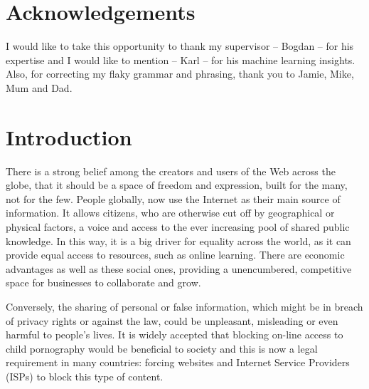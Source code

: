 \documentclass[ %
                    author={Samuel Russell},
                supervisor={Prof. Bogdan Warinschi},
                    degree={MEng},
                     title={Innocuous Ciphertexts},
                  subtitle={The DE-CENSOR Scheme},
                      type={research},
                      year={2018} ]{dissertation}
\begin{document}

\chapter*{Acknowledgements}


I would like to take this opportunity to thank my supervisor -- Bogdan -- for his expertise and I would like to mention -- Karl -- for his machine learning insights. Also, for correcting my flaky grammar and phrasing, thank you to Jamie, Mike, Mum and Dad.


%

\mainmatter


\chapter{Introduction}
\label{chap:intro}

There is a strong belief among the creators and users of the Web across the globe, that it should be a space of freedom and expression, built for the many, not for the few.
People globally, now use the Internet as their main source of information.
It allows citizens, who are otherwise cut off by geographical or physical factors, a voice and access to the ever increasing pool of shared public knowledge.
In this way, it is a big driver for equality across the world, as it can provide equal access to resources, such as online learning.
There are economic advantages as well as these social ones, providing a unencumbered, competitive space for businesses to collaborate and grow.

Conversely, the sharing of personal or false information, which might be in breach of privacy rights or against the law, could be unpleasant, misleading or even harmful to people's lives.
It is widely accepted that blocking on-line access to child pornography would be beneficial to society and this is now a legal requirement in many countries: forcing websites and Internet Service Providers (ISPs) to block this type of content.
\end{document}
